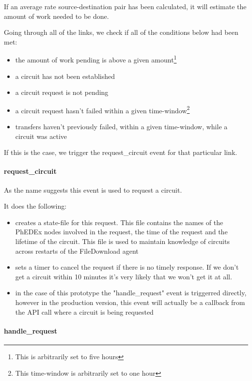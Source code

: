 If an average rate source-destination pair has been calculated, it will estimate
the amount of work needed to be done.

Going through all of the links, we check if all of the conditions below had been met:
\begin{itemize}
  \item the amount of work pending is above a given amount\footnote{This is arbitrarily set to five hours}
  \item a circuit has not been established
  \item a circuit request is not pending
  \item a circuit request hasn't failed within a given time-window\footnote{This time-window is arbitrarily set to one hour}
  \item transfers haven't previously failed, within a given time-window, while a circuit was active 
\end{itemize}

If this is the case, we trigger the request\_circuit event for that particular link.

\paragraph{request\_circuit}

As the name suggests this event is used to request a circuit.

It does the following:
\begin{itemize}
  \item creates a state-file for this request. This file contains the names of the PhEDEx nodes involved in the request, the time of the request and the 
lifetime of the circuit. This file is used to maintain knowledge of circuits across restarts of the FileDownload agent
  \item sets a timer to cancel the request if there is no timely response. If we don't
get a circuit within 10 minutes it's very likely that we won't get it at all.
  \item in the case of this prototype the "handle\_request" event is triggerred directly,
however in the production version, this event will actually be a callback
from the API call where a circuit is being requested
\end{itemize}

\paragraph{handle\_request}

